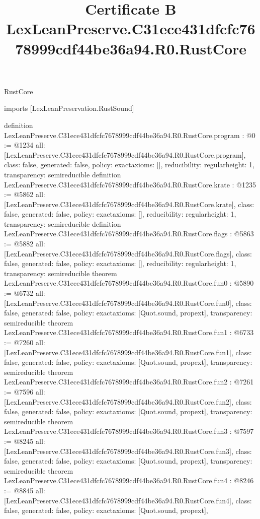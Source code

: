 \begin{lexlean}{RustCore}
\title{Certificate B LexLeanPreserve.C31ece431dfcfc7678999cdf44be36a94.R0.RustCore}
\begin{coremodule}
imports [LexLeanPreservation.RustSound]

definition LexLeanPreserve.C31ece431dfcfc7678999cdf44be36a94.R0.RustCore.program : @0 := @1234 {
  all: [LexLeanPreserve.C31ece431dfcfc7678999cdf44be36a94.R0.RustCore.program],
  class: false,
  generated: false,
  policy: exact{axioms: []},
  reducibility: regular{height: 1},
  transparency: semireducible
}
definition LexLeanPreserve.C31ece431dfcfc7678999cdf44be36a94.R0.RustCore.krate : @1235 := @5862 {
  all: [LexLeanPreserve.C31ece431dfcfc7678999cdf44be36a94.R0.RustCore.krate],
  class: false,
  generated: false,
  policy: exact{axioms: []},
  reducibility: regular{height: 1},
  transparency: semireducible
}
definition LexLeanPreserve.C31ece431dfcfc7678999cdf44be36a94.R0.RustCore.flags : @5863 := @5882 {
  all: [LexLeanPreserve.C31ece431dfcfc7678999cdf44be36a94.R0.RustCore.flags],
  class: false,
  generated: false,
  policy: exact{axioms: []},
  reducibility: regular{height: 1},
  transparency: semireducible
}
theorem LexLeanPreserve.C31ece431dfcfc7678999cdf44be36a94.R0.RustCore.fun0 : @5890 := @6732 {
  all: [LexLeanPreserve.C31ece431dfcfc7678999cdf44be36a94.R0.RustCore.fun0],
  class: false,
  generated: false,
  policy: exact{axioms: [Quot.sound, propext]},
  transparency: semireducible
}
theorem LexLeanPreserve.C31ece431dfcfc7678999cdf44be36a94.R0.RustCore.fun1 : @6733 := @7260 {
  all: [LexLeanPreserve.C31ece431dfcfc7678999cdf44be36a94.R0.RustCore.fun1],
  class: false,
  generated: false,
  policy: exact{axioms: [Quot.sound, propext]},
  transparency: semireducible
}
theorem LexLeanPreserve.C31ece431dfcfc7678999cdf44be36a94.R0.RustCore.fun2 : @7261 := @7596 {
  all: [LexLeanPreserve.C31ece431dfcfc7678999cdf44be36a94.R0.RustCore.fun2],
  class: false,
  generated: false,
  policy: exact{axioms: [Quot.sound, propext]},
  transparency: semireducible
}
theorem LexLeanPreserve.C31ece431dfcfc7678999cdf44be36a94.R0.RustCore.fun3 : @7597 := @8245 {
  all: [LexLeanPreserve.C31ece431dfcfc7678999cdf44be36a94.R0.RustCore.fun3],
  class: false,
  generated: false,
  policy: exact{axioms: [Quot.sound, propext]},
  transparency: semireducible
}
theorem LexLeanPreserve.C31ece431dfcfc7678999cdf44be36a94.R0.RustCore.fun4 : @8246 := @8845 {
  all: [LexLeanPreserve.C31ece431dfcfc7678999cdf44be36a94.R0.RustCore.fun4],
  class: false,
  generated: false,
  policy: exact{axioms: [Quot.sound, propext]},
}
\end{coremodule}
\end{lexlean}
